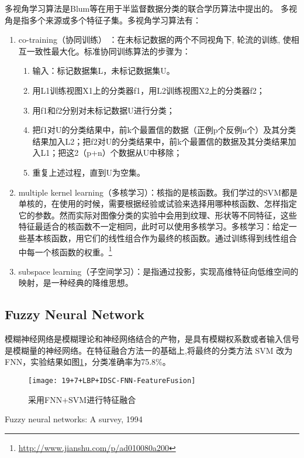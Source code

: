 多视角学习算法是Blum等\cite{blum1998combining}在用于半监督数据分类的联合学历算法中提出的。
多视角是指多个来源或多个特征子集。多视角学习算法有：
\begin{enumerate}
\item co-training（协同训练） ：在未标记数据的两个不同视角下, 轮流的训练, 使相互一致性最大化。标准协同训练算法的步骤为：
    \begin{enumerate}
    \item 输入：标记数据集L，未标记数据集U。
    \item 用L1训练视图X1上的分类器f1，用L2训练视图X2上的分类器f2；
    \item 用f1和f2分别对未标记数据U进行分类；
    \item 把f1对U的分类结果中，前k个最置信的数据（正例p个反例n个）及其分类结果加入L2；把f2对U的分类结果中，前k个最置信的数据及其分类结果加入L1；把这2（p+n）个数据从U中移除；
    \item 重复上述过程，直到U为空集。
    \end{enumerate}
\item multiple kernel learning（多核学习）：核指的是核函数。我们学过的SVM都是单核的，在使用的时候，需要根据经验或试验来选择用哪种核函数、怎样指定它的参数。然而实际对图像分类的实验中会用到纹理、形状等不同特征，这些特征最适合的核函数不一定相同，此时可以使用多核学习。多核学习：给定一些基本核函数，用它们的线性组合作为最终的核函数。通过训练得到线性组合中每一个核函数的权重。\footnote{\url{http://www.jianshu.com/p/ad010080a200}}
\item subspace learning（子空间学习）：是指通过投影，实现高维特征向低维空间的映射，是一种经典的降维思想。
\end{enumerate}

\subsection{Fuzzy Neural Network}
模糊神经网络是模糊理论和神经网络结合的产物，是具有模糊权系数或者输入信号是模糊量的神经网络。在特征融合方法一的基础上,将最终的分类方法 SVM 改为FNN，实验结果如图\ref{fig:19+7+LBP+IDSC-FNN-FeatureFusion}，分类准确率为75.8\%。
\begin{figure}[!ht]
\centering
\texttt{[image: 19+7+LBP+IDSC-FNN-FeatureFusion]}
\caption{采用FNN+SVM进行特征融合}
\label{fig:19+7+LBP+IDSC-FNN-FeatureFusion}
\end{figure}

Fuzzy neural networks: A survey, 1994


